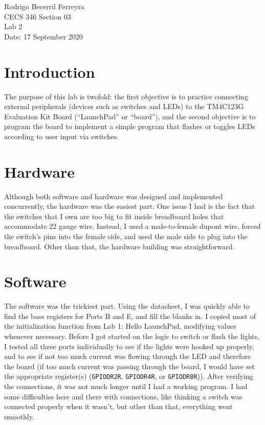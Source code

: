 \documentclass{article}
\renewcommand{\c}[1]{\texttt{#1}}
\begin{document}
    \noindent
    Rodrigo Becerril Ferreyra\\
    CECS 346 Section 03\\
    Lab 2\\
    Date: 17 September 2020

\section{Introduction} The purpose of this lab is
twofold: the first objective is to practice
connecting external peripherals (devices such as switches
and LEDs) to the TM4C123G Evaluation Kit Board
(``LaunchPad'' or ``board''),
and the second objective is to program the board to implement a
simple program that flashes or toggles LEDs according to
user input via switches.

\section{Hardware} Although both software and hardware was
designed and implemented concurrently, the hardware was the
easiest part. One issue I had is the fact that the switches
that I own are too big to fit inside breadboard holes that
accommodate \num{22} gauge wire. Instead, I used a
male-to-female dupont wire, forced the switch's pins
into the female side, and used the male side to plug into
the breadboard. Other than that, the hardware building was
straightforward.

\section{Software} The software was the trickiest part.
Using the datasheet, I was quickly able to find the base
registers for Ports B and E, and fill the blanks in.
I copied most of the initialization function from Lab 1:
Hello LaunchPad, modifying values whenever necessary. Before
I got started on the logic to switch or flash the lights,
I tested all three ports individually to see if the lights
were hooked up properly, and to see if not too much current
was flowing through the LED and therefore the board (if
too much current
was passing through the board, I would have set the
appropriate register(s)
(\c{GPIODR2R}, \c{GPIODR4R}, or \c{GPIODR8R})). After
verifying the connections, it was not much longer
until I had a working program. I had some difficulties
here and there with connections, like thinking a switch was
connected properly when it wasn't, but other than that,
everything went smoothly.
\end{document}
